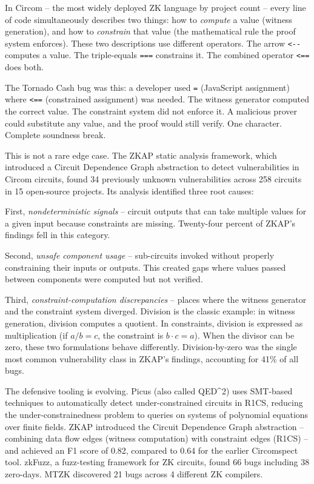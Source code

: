 \documentclass[
  11pt,
  openany]{report}
\begin{document}
In Circom -- the most widely deployed ZK language by project count -- every line
of code simultaneously describes two things: how to \emph{compute} a value
(witness generation), and how to \emph{constrain} that value (the mathematical
rule the proof system enforces). These two descriptions use different operators.
The arrow \texttt{\textless{}-\/-} computes a value. The triple-equals
\texttt{===} constrains it. The combined operator \texttt{\textless{}==} does
both.

The Tornado Cash bug was this: a developer used \texttt{=} (JavaScript
assignment) where \texttt{\textless{}==} (constrained assignment) was needed.
The witness generator computed the correct value. The constraint system did not
enforce it. A malicious prover could substitute any value, and the proof would
still verify. One character. Complete soundness break.

This is not a rare edge case. The ZKAP static analysis framework, which
introduced a Circuit Dependence Graph abstraction to detect vulnerabilities in
Circom circuits, found 34 previously unknown vulnerabilities across 258 circuits
in 15 open-source projects. Its analysis identified three root causes:

First, \emph{nondeterministic signals} -- circuit outputs that can take multiple
values for a given input because constraints are missing. Twenty-four percent of
ZKAP's findings fell in this category.

Second, \emph{unsafe component usage} -- sub-circuits invoked without properly
constraining their inputs or outputs. This created gaps where values passed
between components were computed but not verified.

Third, \emph{constraint-computation discrepancies} -- places where the witness
generator and the constraint system diverged. Division is the classic example:
in witness generation, division computes a quotient. In constraints, division is
expressed as multiplication (if \(a/b = c\), the constraint is
\(b \cdot c = a\)). When the divisor can be zero, these two formulations behave
differently. Division-by-zero was the single most common vulnerability class in
ZKAP's findings, accounting for 41\% of all bugs.

The defensive tooling is evolving. Picus (also called QED\^{}2) uses SMT-based
techniques to automatically detect under-constrained circuits in R1CS, reducing
the under-constrainedness problem to queries on systems of polynomial equations
over finite fields. ZKAP introduced the Circuit Dependence Graph abstraction --
combining data flow edges (witness computation) with constraint edges (R1CS) --
and achieved an F1 score of 0.82, compared to 0.64 for the earlier Circomspect
tool. zkFuzz, a fuzz-testing framework for ZK circuits, found 66 bugs including
38 zero-days. MTZK discovered 21 bugs across 4 different ZK compilers.
\end{document}

